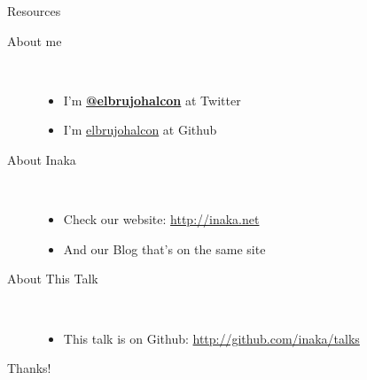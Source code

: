 \documentclass[utf8,hyperref={colorlinks=true}]{beamer}
\begin{document}
\begin{frame}{Resources}
	\begin{description}
		\item[About me]~\\
			\begin{itemize}
				\item I'm \textbf{\href{http://twitter.com/elbrujohalcon}{@elbrujohalcon}} at Twitter
				\item I'm \href{http://github.com/elbrujohalcon}{elbrujohalcon} at Github
			\end{itemize}
		\item[About Inaka]~\\
			\begin{itemize}
				\item Check our website: \href{http://inakanetworks.com}{http://inaka.net}
				\item And our Blog that's on the same site
			\end{itemize}
		\item[About This Talk]~\\
			\begin{itemize}
				\item This talk is on Github: \href{http://github.com/inaka/talks/pdfs/lucene\_server.pdf}{http://github.com/inaka/talks}
			\end{itemize}
	\end{description}
\end{frame}

\appendix

\begin{frame}
	\begin{center}
		{\Huge Thanks!}
	\end{center}
\end{frame}
\end{document}
